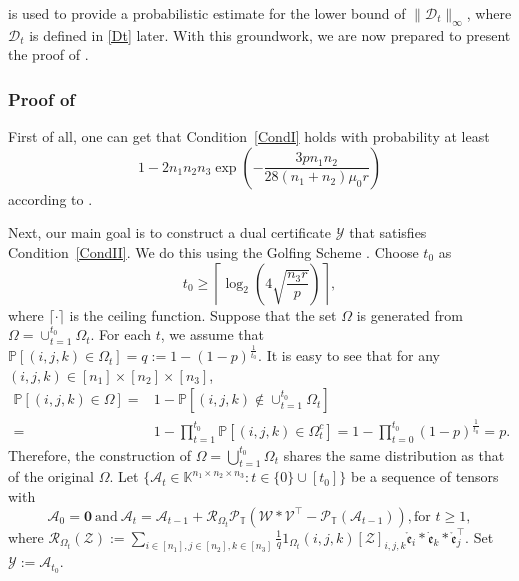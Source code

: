 \documentclass[twoside,12pt]{article}
\newtheorem{remark}{Remark}
\def\dme{{\dot{\mathfrak{e}}}}
\def\mrme{{\mathring{\mathfrak{e}}}}
\begin{document}
 is used to provide a probabilistic estimate for  the lower bound of $\|\mathcal{D}_{t}\|_{\infty}$, where $\mathcal{D}_{t}$ is defined in \eqref{Dt} later. With this groundwork, we are now prepared to present the proof of .


\subsubsection{\textnormal{Proof of }}
First of all, one can get that Condition~\ref{CondI} holds with probability  at least  
\begin{equation}\label{eqn:probability4CI}
    1-2n_1n_2n_3  \exp\left(-\frac{3pn_1n_2}{28(n_1+n_2)\mu_0 r}\right) 
\end{equation}
according to .

Next, our main goal is to construct a dual certificate $\mathcal{Y}$ that satisfies Condition~\ref{CondII}. We do this using the Golfing Scheme \citep{candes2011robust}. %
Choose  $t_0$ as
\begin{equation}
\label{t0}
 t_0 \geq \left\lceil\log_2\left(4\sqrt{\frac{n_3r}{p}}\right)\right\rceil, 
\end{equation}
where $\lceil\cdot
\rceil$ is the ceiling function. Suppose that the set $\Omega$ is generated from $\Omega = \cup_{t=1}^{t_0} \Omega_{t}$. For each $t$, we assume that $\mathbb{P}[(i,j,k)\in \Omega_t] = q := 1 - (1-p)^{\frac{1}{t_0}}$. It is easy to see that for any $(i,j,k) \in [n_1]\times [n_2] \times [n_3]$, 
\begin{align*}
  \mathbb{P}[(i,j,k)\in \Omega] = & 1 - \mathbb{P}[(i,j,k)\notin \cup_{t=1}^{t_0}\Omega_{t}]  \\
= &1 - \prod\limits_{t=1}^{t_0}\mathbb{P}[(i,j,k)\in \Omega_{t}^{c}]  = 1 -\prod\limits_{t=0}^{t_0}(1-p)^{\frac{1}{t_0}} 
= p.
\end{align*}
Therefore, the construction of $\Omega = \bigcup_{t=1}^{t_0}\Omega_{t}$  shares the same distribution as that of the original $\Omega$. 
Let $\{\mathcal{A}_{t}\in \mathbb{K}^{n_1\times n_2 \times n_3}: t \in \{0\}\cup[t_0]\}$ be a sequence of tensors with 
$$
\mathcal{A}_{0} = \mathbf{0} ~\text{and}~  \mathcal{A}_{t} = \mathcal{A}_{t-1} + \mathcal{R}_{\Omega_t}\mathcal{P}_{\mathbb{T}}(\mathcal{W}*\mathcal{V}^{\top}-\mathcal{P}_{\mathbb{T}}(\mathcal{A}_{t-1})), \text{for } t\geq 1,
$$
where $\mathcal{R}_{\Omega_t}(\mathcal{Z}):= \sum_{i\in [n_1],j\in[n_2],k\in [n_3]}\frac{1}{q} 1_{\Omega_t}(i,j,k)[\mathcal{Z}]_{i,j,k}\mrme_i * \dme_k * \mrme_j^{\top}$. 
Set $\mathcal{Y} := \mathcal{A}_{t_0}$.
\end{document}
